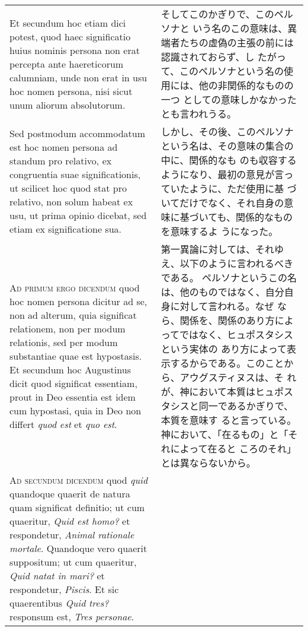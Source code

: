 \documentclass[10pt]{jsarticle} %
\begin{document}
\begin{longtable}{p{21em}p{21em}}
\\

Et secundum hoc etiam
dici potest, quod haec significatio huius nominis persona non erat
percepta ante haereticorum calumniam, unde non erat in usu hoc nomen
persona, nisi sicut unum aliorum absolutorum. 


&

そしてこのかぎりで、このペルソナと
 いう名のこの意味は、異端者たちの虚偽の主張の前には認識されておらず、し
 たがって、このペルソナという名の使用には、他の非関係的なものの一つ
 としての意味しかなかったとも言われうる。

\\


Sed postmodum accommodatum
est hoc nomen persona ad standum pro relativo, ex congruentia suae
significationis, ut scilicet hoc quod stat pro relativo, non solum
habeat ex usu, ut prima opinio dicebat, sed etiam ex significatione sua.


&

しかし、その後、このペルソナという名は、その意味の集合の中に、関係的なも
 のも収容するようになり、最初の意見が言っていたように、ただ使用に基
 づいてだけでなく、それ自身の意味に基づいても、関係的なものを意味するよ
 うになった。

\\



{\scshape Ad primum ergo dicendum} quod hoc nomen persona dicitur ad se, non ad
alterum, quia significat relationem, non per modum relationis, sed per
modum substantiae quae est hypostasis. Et secundum hoc Augustinus dicit
quod significat essentiam, prout in Deo essentia est idem cum hypostasi,
quia in Deo non differt {\itshape quod est} et {\itshape quo est}.


&

第一異論に対しては、それゆえ、以下のように言われるべきである。
ペルソナというこの名は、他のものではなく、自分自身に対して言われる。なぜ
 なら、関係を、関係のあり方によってではなく、ヒュポスタシスという実体の
 あり方によって表示するからである。このことから、アウグスティヌスは、そ
 れが、神において本質はヒュポスタシスと同一であるかぎりで、本質を意味す
 ると言っている。神において、「在るもの」と「それによって在ると
 ころのそれ」とは異ならないから。


\\



{\scshape Ad secundum dicendum} quod {\itshape quid} quandoque quaerit de natura quam
significat definitio; ut cum quaeritur, {\itshape Quid est homo?} et respondetur,
{\itshape Animal rationale mortale}. Quandoque vero quaerit suppositum; ut cum
quaeritur, {\itshape Quid natat in mari?} et respondetur, {\itshape Piscis}. Et sic
quaerentibus {\itshape Quid tres?} responsum est, {\itshape Tres personae}.



\end{longtable}
\end{document}
